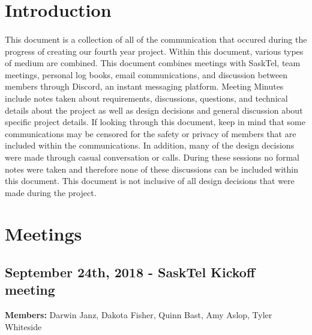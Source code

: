 \documentclass[12pt]{article}
\begin{document}
\pagestyle{plain} %

\tableofcontents %
\cleardoublepage %

\pagestyle{plain} %



\doublespacing
\section{Introduction}
\paragraph{}
	This document is a collection of all of the communication that occured during the progress of creating our fourth year project. Within this document, various types of medium are combined. This document combines meetings with SaskTel, team meetings, personal log books, email communications, and discussion between members through Discord, an instant messaging platform. Meeting Minutes include notes taken about requirements, discussions, questions, and technical details about the project as well as design decisions and general discussion about specific project details. If looking through this document, keep in mind that some communications may be censored for the safety or privacy of members that are included within the communications. In addition, many of the design decisions were made through casual conversation or calls. During these sessions no formal notes were taken and therefore none of these discussions can be included within this document. This document is not inclusive of all design decisions that were made during the project.

\section{Meetings}
\subsection{September 24th, 2018 - SaskTel Kickoff meeting}
\textbf{Members:} Darwin Janz, Dakota Fisher, Quinn Bast, Amy Aslop, Tyler Whiteside
\end{document}
